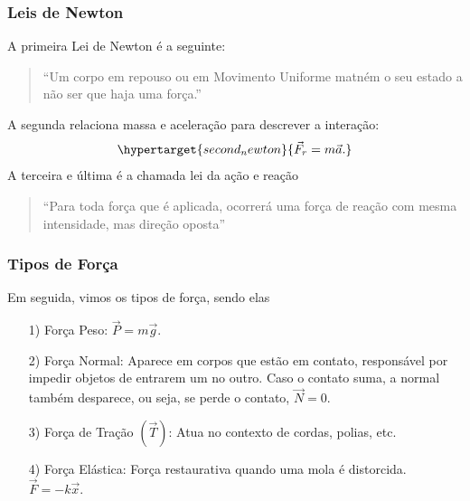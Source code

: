 \documentclass{article}
\begin{document}
  \subsubsection{Leis de Newton}
  A primeira Lei de Newton \'e a seguinte:
 \begin{quote}
   \hypertarget{first_newton}{``Um corpo em repouso ou em Movimento Uniforme matn\'em o seu estado a n\~ao ser que haja uma for\c ca.''}
    \end{quote}
  A segunda relaciona massa e acelera\c c\~ao para descrever a intera\c c\~ao: 
    $$
    \hypertarget{second_newton}{\vec{F}_{r} = m \vec{a}.}
    $$
  A terceira e \'ultima \'e a chamada lei da a\c c\~ao e rea\c c\~ao 
 \begin{quote}
   \hypertarget{third_newton}{``Para toda for\c ca que \'e aplicada, ocorrer\'a uma for\c ca de rea\c c\~ao com mesma intensidade, mas dire\c c\~ao oposta''}
  \end{quote}
 \subsubsection{Tipos de For\c ca}
 Em seguida, vimos os tipos de for\c ca, sendo elas 
\begin{itemize}
  \item[1)] For\c ca Peso: $\vec{P} = m \vec{g}.$
  \item[2)] For\c ca Normal: Aparece em corpos que est\~ao em contato, respons\'avel por impedir objetos de entrarem um no outro.
  Caso o contato suma, a normal tamb\'em desparece, ou seja, se perde o contato, $\vec{N} = 0.$
  \item[3)] For\c ca de Tra\c c\~ao $(\vec{T})$: Atua no contexto de cordas, polias, etc.
  \item[4)] For\c ca El\'astica: For\c ca restaurativa quando uma mola \'e distorcida. $\vec{F} = -k \vec{x}.$
\end{itemize}
\end{document}
